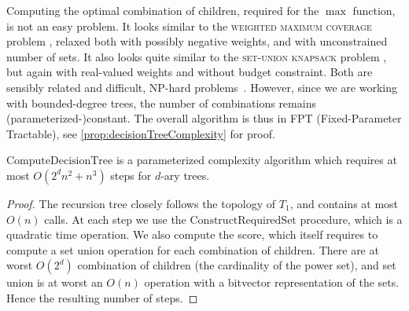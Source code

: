    			Computing the optimal combination of children, required for the $\max$ function, is not an easy problem.
   			It looks similar to the \textsc{weighted maximum coverage} problem \parencite{hochbaum1996approximation}, relaxed both with possibly negative weights, and with unconstrained number of sets.
   			It also looks quite similar to the \textsc{set-union knapsack} problem \parencite{goldschmidt1994note}, but again with real-valued weights and without budget constraint.
   			Both are sensibly related and difficult, NP-hard problems~\parencites{hochbaum1996approximation,cohen2008generalized}.
   			However, since we are working with bounded-degree trees, the number of combinations remains (parameterized-)constant. The overall algorithm is thus in FPT (Fixed-Parameter Tractable), see \cref{prop:decisionTreeComplexity} for proof.
   
   			\begin{proposition}
   				$\text{ComputeDecisionTree}$ is a parameterized complexity algorithm which requires at most $O(2^d n^2 + n^3)$ steps for $d$-ary trees.
   				\label{prop:decisionTreeComplexity}
   			\end{proposition}
   			\begin{proof}
   				The recursion tree closely follows the topology of $T_1$, and contains at most $O(n)$ calls.
   				At each step we use the $\text{ConstructRequiredSet}$ procedure, which is a quadratic time operation.
   				We also compute the score, which itself requires to compute a set union operation for each combination of children.
   				There are at worst $O(2^d)$ combination of children (the cardinality of the power set), and set union is at worst an $O(n)$ operation with a bitvector representation of the sets.
   				Hence the resulting number of steps.
   			\end{proof}
   
   
